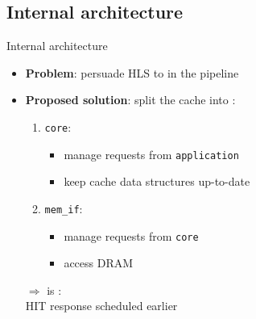 \documentclass[handout,aspectratio=169]{beamer}
\begin{document}
\subsection{Internal architecture}
\begin{frame}{Internal architecture}
	\begin{minipage}{.7\textwidth}
		\begin{itemize}[<+->]
			\item \textbf{Problem}: persuade HLS to  in the pipeline
			\item \textbf{Proposed solution}: split the cache into
				:
			\begin{enumerate}[<.->]
				\item \texttt{core}:
					\begin{itemize}
						\item manage requests from \texttt{application}
						\item keep cache data structures up-to-date
					\end{itemize}
				\item \texttt{mem\_if}:
					\begin{itemize}
						\item manage requests from \texttt{core}
						\item access DRAM
					\end{itemize}
			\end{enumerate}
			\pause[\thebeamerpauses]
				\begin{center}
					$\Rightarrow$  is :\\
					HIT response scheduled earlier
				\end{center}
	\end{itemize}
	\end{minipage}
	\begin{minipage}{.28\textwidth}
		\begin{center}

\end{center}
\end{minipage}
\end{frame}
\end{document}
